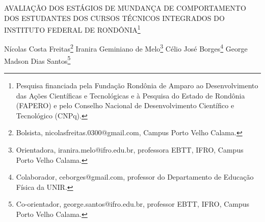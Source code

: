 \documentclass[article,12pt,onesidea,4paper,english,brazil]{abntex2}
\begin{document}
	
	
	\frenchspacing 
	
	\begin{center}
		\LARGE AVALIAÇÃO DOS ESTÁGIOS DE MUNDANÇA DE COMPORTAMENTO DOS
		ESTUDANTES DOS CURSOS TÉCNICOS INTEGRADOS DO INSTITUTO
		FEDERAL DE RONDÔNIA\footnote{Pesquisa financiada pela Fundação Rondônia de Amparo ao Desenvolvimento das Ações Científicas e Tecnológicas e à Pesquisa do Estado de Rondônia (FAPERO) e pelo Conselho Nacional de Desenvolvimento Científico e Tecnológico (CNPq).}
		
		\normalsize
		Nícolas Costa Freitas\footnote{Bolsista, nicolasfreitas.0300@gmail.com, Campus Porto Velho Calama.} 
		Iranira Geminiano de Melo\footnote{Orientadora, iranira.melo@ifro.edu.br, professora EBTT, IFRO, Campus Porto Velho Calama.} 
		Célio José Borges\footnote{Colaborador, ceborges@gmail.com, professor do Departamento de Educação Física da UNIR.} 
		George Madson Dias Santos\footnote{Co-orientador, george.santos@ifro.edu.br, professor EBTT, IFRO, Campus Porto Velho Calama.} 
	\end{center}
	
\end{document}
